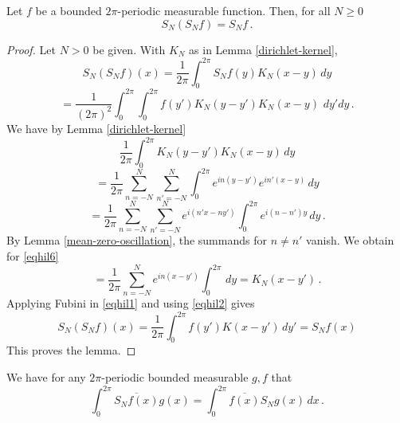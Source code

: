 {\begin{lemma}
\label{partial-sum-projection}
  Let $f$ be a bounded $2\pi$-periodic measurable function. Then, for all $N\ge 0$
   \begin{equation}\label{projection}
   S_N(S_N f)=S_Nf\, .
   \end{equation}
   \end{lemma}
\begin{proof}
Let $N>0$ be given. With $K_N$ as in Lemma \ref{dirichlet-kernel},
\begin{equation*}
S_N (S_Nf) (x)=
\frac{1}{2\pi} \int_0^{2\pi} S_Nf(y)K_N(x-y)\, dy
\end{equation*}
\begin{equation}\label{eqhil1}
=
\frac{1}{(2\pi)^2}\int_0^{2\pi} \int_0^{2\pi} f(y')K_N(y-y') K_N(x-y)\, \, dy' dy\, .
\end{equation}
We have by Lemma \ref{dirichlet-kernel}
\begin{equation*}
\frac{1}{2\pi}\int_0^{2\pi} K_N(y-y') K_N(x-y)\,  dy
\end{equation*}
\begin{equation*}
=\frac{1}{2\pi}\sum_{n=-N}^N\sum_{n'=-N}^N
\int_0^{2\pi} e^{in(y-y')}e^{in'(x-y)}\,  dy
\end{equation*}
\begin{equation}\label{eqhil6}
=\frac{1}{2\pi}\sum_{n=-N}^N\sum_{n'=-N}^N
e^{i(n'x-ny')}\int_0^{2\pi} e^{i(n-n')y}\,  dy\, .
\end{equation}
By Lemma \ref{mean-zero-oscillation}, the summands for $n\neq n'$ vanish.
We obtain for \eqref{eqhil6}
\begin{equation}\label{eqhil2}
=\frac{1}{2\pi}\sum_{n=-N}^N
e^{in(x-y')}\int_0^{2\pi} \,  dy=K_N(x-y')\, .
\end{equation}
Applying Fubini in  \eqref{eqhil1} and using
\eqref{eqhil2} gives
\begin{equation}
S_N(S_Nf)(x)=
\frac{1}{2\pi} \int_0^{2\pi}  f(y')K(x-y')  \, dy'=S_N f(x)
\end{equation}
This proves the lemma.
\end{proof}
\begin{lemma}
\label{partial-sum-selfadjoint}
    We have for any $2\pi$-periodic bounded measurable $g,f$ that
    \begin{equation}
       \int_0^{2\pi} \overline{S_Nf(x)} g(x)=\int_0^{2\pi} \overline{f(x)} S_Ng(x)\, dx\, .
    \end{equation}
\end{lemma}
}
